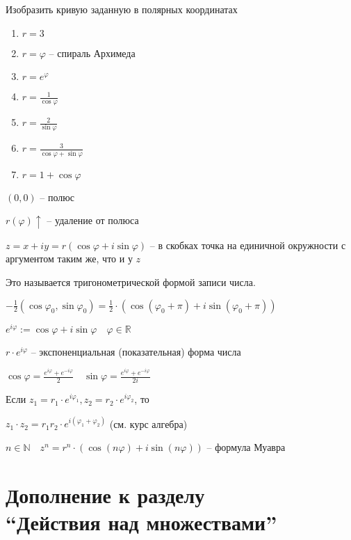 \documentclass{book}
\newcommand\N{\ensuremath{\mathbb{N}}}
\newcommand\R{\ensuremath{\mathbb{R}}}
\renewcommand\phi{\varphi}
\theoremstyle{definition}
\begin{document}
        Изобразить кривую заданную в полярных координатах 
        \begin{enumerate}
            \item $r = 3$
            \item $r = \phi$ -- спираль Архимеда
            \item $r = e^{\phi}$
            \item $r = \frac{1}{\cos \phi}$
            \item $r = \frac{2}{\sin \phi}$
            \item $r = \frac{3}{\cos \phi + \sin \phi}$
            \item $r = 1+\cos \phi$
        \end{enumerate}

        $(0,0)$ -- полюс

        $r(\phi) \uparrow$ -- удаление от полюса

        $z = x+iy = r(\cos \phi + i\sin \phi)$ -- в скобках точка на единичной окружности с аргументом таким же, что и у $z$

        Это называется тригонометрической формой записи числа.

        $-\frac{1}{2}(\cos \phi_0, \sin \phi_0) = \frac{1}{2} \cdot  \left( \cos (\phi_0+\pi ) + i\sin (\phi_0+\pi ) \right) $

        $e^{i\phi}:=\cos \phi + i\sin\phi\quad \phi\in \R$

        $r\cdot e^{i\phi}$ -- экспоненциальная (показательная) форма числа

        $\cos \phi = \frac{e^{i\phi} + e^{-i\phi}}{2}\quad \sin \phi = \frac{e^{i\phi} + e^{-i\phi}}{2i}$

        Если $z_1 = r_1 \cdot  e^{i\phi_1}, z_2 = r_2 \cdot  e^{i\phi_2}$, то 

        $z_1\cdot z_2 = r_1r_2\cdot e^{i\left( \phi_1 + \phi_2 \right) }$ (см. курс алгебра)

        $n\in \N \quad z^n = r^n \cdot  (\cos (n\phi) + i\sin(n\phi))$ -- формула Муавра

        \section{Дополнение к разделу\\``Действия над множествами''}
\end{document}
